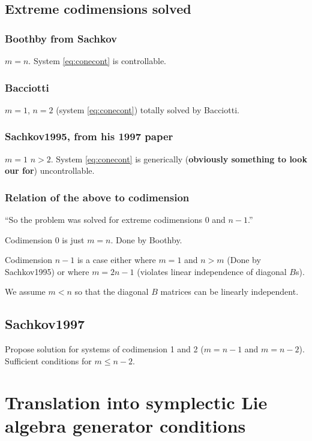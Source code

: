 \subsection{Extreme codimensions solved}

\subsubsection{Boothby from Sachkov}
$m=n$. System \ref{eq:conecont} is controllable.

\subsubsection{Bacciotti}
$m=1$, $n=2$ (system \ref{eq:conecont}) totally solved by Bacciotti.

\subsubsection{Sachkov1995, from his 1997 paper}
$m=1$ $n>2$. System \ref{eq:conecont} is generically (\textbf{obviously something to look our for}) uncontrollable.

\subsubsection{Relation of the above to codimension}
``So the problem was solved for extreme codimensions $0$ and $n-1$.''

Codimension 0 is just $m=n$. Done by Boothby.

Codimension $n-1$ is a case either where $m=1$ and $n>m$ (Done by Sachkov1995) or where $m = 2n - 1$ (violates linear independence of diagonal $B$s).

We assume $m < n$ so that the diagonal $B$ matrices can be linearly independent.

\subsection{Sachkov1997}
Propose solution for systems of codimension 1 and 2 ($m=n-1$ and $m=n-2$). Sufficient conditions for $m \leq n-2$.

\section{Translation into symplectic Lie algebra generator conditions}


